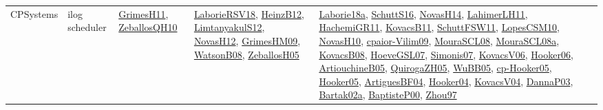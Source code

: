 {\begin{longtable}{lp{3cm}>{\raggedright}p{6cm}>{\raggedright}p{6cm}p{8cm}}
CPSystems & ilog scheduler & \href{papers/GrimesH11.pdf}{GrimesH11}\cite{GrimesH11}, \href{articles/ZeballosQH10.pdf}{ZeballosQH10}\cite{ZeballosQH10} & \href{articles/LaborieRSV18.pdf}{LaborieRSV18}\cite{LaborieRSV18}, \href{papers/HeinzB12.pdf}{HeinzB12}\cite{HeinzB12}, \href{articles/LimtanyakulS12.pdf}{LimtanyakulS12}\cite{LimtanyakulS12}, \href{articles/NovasH12.pdf}{NovasH12}\cite{NovasH12}, \href{papers/GrimesHM09.pdf}{GrimesHM09}\cite{GrimesHM09}, \href{papers/WatsonB08.pdf}{WatsonB08}\cite{WatsonB08}, \href{articles/ZeballosH05.pdf}{ZeballosH05}\cite{ZeballosH05} & \href{papers/Laborie18a.pdf}{Laborie18a}\cite{Laborie18a}, \href{papers/SchuttS16.pdf}{SchuttS16}\cite{SchuttS16}, \href{articles/NovasH14.pdf}{NovasH14}\cite{NovasH14}, \href{papers/LahimerLH11.pdf}{LahimerLH11}\cite{LahimerLH11}, \href{articles/HachemiGR11.pdf}{HachemiGR11}\cite{HachemiGR11}, \href{articles/KovacsB11.pdf}{KovacsB11}\cite{KovacsB11}, \href{articles/SchuttFSW11.pdf}{SchuttFSW11}\cite{SchuttFSW11}, \href{articles/LopesCSM10.pdf}{LopesCSM10}\cite{LopesCSM10}, \href{articles/NovasH10.pdf}{NovasH10}\cite{NovasH10}, \href{papers/cpaior-Vilim09.pdf}{cpaior-Vilim09}\cite{cpaior-Vilim09}, \href{papers/MouraSCL08.pdf}{MouraSCL08}\cite{MouraSCL08}, \href{papers/MouraSCL08a.pdf}{MouraSCL08a}\cite{MouraSCL08a}, \href{articles/KovacsB08.pdf}{KovacsB08}\cite{KovacsB08}, \href{papers/HoeveGSL07.pdf}{HoeveGSL07}\cite{HoeveGSL07}, \href{articles/Simonis07.pdf}{Simonis07}\cite{Simonis07}, \href{papers/KovacsV06.pdf}{KovacsV06}\cite{KovacsV06}, \href{articles/Hooker06.pdf}{Hooker06}\cite{Hooker06}, \href{papers/ArtiouchineB05.pdf}{ArtiouchineB05}\cite{ArtiouchineB05}, \href{papers/QuirogaZH05.pdf}{QuirogaZH05}\cite{QuirogaZH05}, \href{papers/WuBB05.pdf}{WuBB05}\cite{WuBB05}, \href{papers/cp-Hooker05.pdf}{cp-Hooker05}\cite{cp-Hooker05}, \href{articles/Hooker05.pdf}{Hooker05}\cite{Hooker05}, \href{papers/ArtiguesBF04.pdf}{ArtiguesBF04}\cite{ArtiguesBF04}, \href{papers/Hooker04.pdf}{Hooker04}\cite{Hooker04}, \href{papers/KovacsV04.pdf}{KovacsV04}\cite{KovacsV04}, \href{papers/DannaP03.pdf}{DannaP03}\cite{DannaP03}, \href{papers/Bartak02a.pdf}{Bartak02a}\cite{Bartak02a}, \href{articles/BaptisteP00.pdf}{BaptisteP00}\cite{BaptisteP00}, \href{articles/Zhou97.pdf}{Zhou97}\cite{Zhou97}\\

\end{longtable}}
